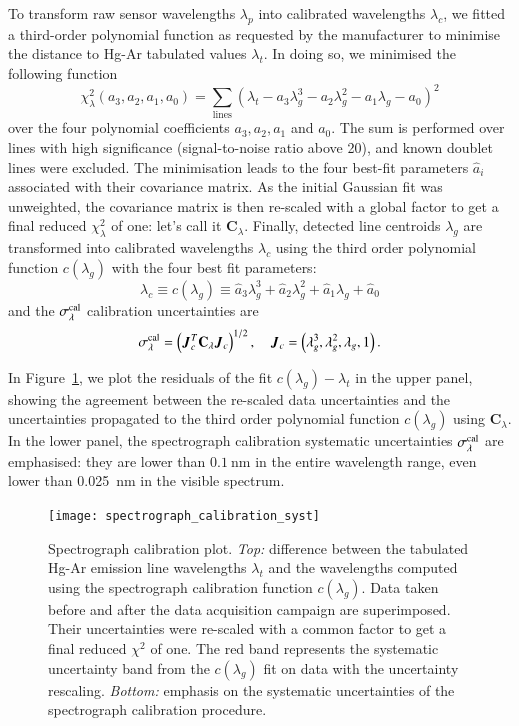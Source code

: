 To transform raw sensor wavelengths $\lambda_p$ into calibrated wavelengths $\lambda_c$, we fitted a third-order polynomial function as requested by the manufacturer to minimise the distance to Hg-Ar tabulated values $\lambda_t$. In doing so, we minimised the following function 
\begin{equation}
    \chi_\lambda^2(a_3, a_2, a_1, a_0) = \sum_{\text{lines}} \left(\lambda_t-a_3 \lambda_g^3 - a_2 \lambda_g^2-a_1 \lambda_g -a_0\right)^2
\end{equation}
over the four polynomial coefficients $a_3, a_2, a_1$ and $a_0$. The sum is performed over lines with high significance (signal-to-noise ratio above 20), and known doublet lines were excluded. The minimisation leads to the four best-fit parameters $\hat a_i$ associated with their covariance matrix. 
As the initial Gaussian fit was unweighted, the covariance matrix is then re-scaled with a global factor to get a final reduced $\chi_\lambda^2$ of one: let's call it $\mathbf{C}_\lambda$. 
Finally, detected line centroids $\lambda_g$ are transformed into calibrated wavelengths $\lambda_c$ using the third order polynomial function $c(\lambda_g)$ with the four best fit parameters:  
\begin{equation}
    \lambda_c \equiv c(\lambda_g) \equiv \hat a_3 \lambda_g^3 + \hat a_2 \lambda_g^2+\hat a_1 \lambda_g +\hat a_0
\end{equation}
and the $\sigma_\lambda^{\rm cal}$ calibration uncertainties are
\begin{equation}
    \sigma_\lambda^{\rm cal} = \left(\vec J_c^T \mathbf{C}_\lambda \vec J_c\right)^{1/2},\quad \vec J_c = \left(\lambda_g^3, \lambda_g^2, \lambda_g, 1\right).
\end{equation}

In Figure~\ref{fig:spectro_calib_syst}, we plot the residuals of the fit $c(\lambda_g)-\lambda_t$ in the upper panel, showing the agreement between the re-scaled data uncertainties and the uncertainties propagated to the third order polynomial function $c(\lambda_g)$ using $\mathbf{C}_\lambda$. In the lower panel, the spectrograph calibration systematic uncertainties $\sigma_\lambda^{\rm cal}$ are emphasised: they are lower than $\SI{0.1}{\nm}$ in the entire wavelength range, even lower than \SI{0.025}{\nm} in the visible spectrum.

\begin{figure}[!h]
\centering
\texttt{[image: spectrograph\_calibration\_syst]}
\caption{Spectrograph calibration plot. \textit{Top:} difference between the tabulated Hg-Ar emission line wavelengths $\lambda_t$ and the wavelengths computed using the spectrograph calibration function $c(\lambda_g)$. Data taken before and after the data acquisition campaign are superimposed. Their uncertainties were re-scaled with a common factor to get a final reduced $\chi^2$ of one. The red band represents the systematic uncertainty band from the $c(\lambda_g)$ fit on data with the uncertainty rescaling. \textit{Bottom:} emphasis on the systematic uncertainties of the spectrograph calibration procedure.}\label{fig:spectro_calib_syst}
\end{figure}

